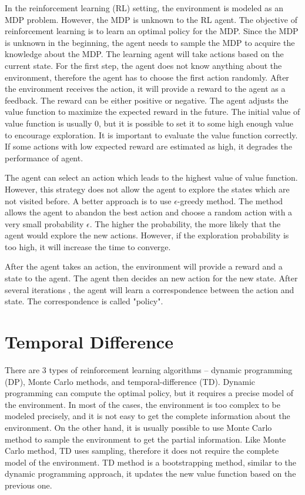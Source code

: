 In the reinforcement learning (RL) setting, the environment is modeled as an MDP problem.
However, the MDP is unknown to the RL agent. The objective of reinforcement learning is to 
learn an optimal policy for the MDP. Since the MDP is unknown in the beginning, 
the agent needs to sample the MDP to acquire the knowledge about the MDP.
The learning agent will take actions based on the current state. For the first step, the agent does not know anything about 
the environment, therefore the agent has to choose the first action randomly. After the environment
receives the action, it will provide a reward to the agent as a feedback. The reward can be either
positive or negative. The agent adjusts the value function to maximize the expected reward in the future.
The initial value of value function is 
usually 0, but it is possible to set it to some high enough value to encourage exploration.
It is important to evaluate the value function 
correctly. If some actions with low expected reward are estimated as high, it degrades the
performance of agent.

The agent can select an action which leads to the highest value of value function. However, 
this strategy does not allow the agent to explore the states which are not visited before.
A better approach is to use $\epsilon$-greedy method. The method allows the agent to abandon the
best action and choose
a random action with a very small probability $\epsilon$. The higher the probability, the more
likely that the agent would explore the new actions. However, if the exploration probability 
is too high, it will increase the time to converge.

After the agent takes an action, the environment will provide a reward and a state to the
agent. The agent then decides an new action for the new state. After several iterations
, the agent will learn a correspondence between the action and state. The correspondence is called 
"policy". 

\section{Temporal Difference}
\label{sec:TD}
There are 3 types of reinforcement learning algorithms -- dynamic programming (DP), Monte Carlo 
methods, and temporal-difference (TD). Dynamic programming can compute the optimal policy, but it 
requires a precise model of the environment. In most of the cases, the environment
is too complex to be modeled precisely, and it is not easy to get the complete information about
the environment. On the other hand, it is usually possible to use Monte Carlo method to sample the environment to
get the partial information. 
Like Monte Carlo method, TD uses sampling, therefore it does not require the 
complete model of the environment. TD method is a bootstrapping method, similar to the dynamic 
programming approach, it updates the new value function based on the previous one.

